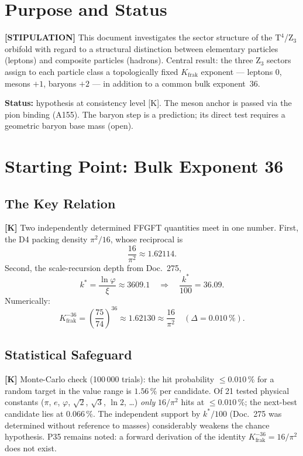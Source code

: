 
\section{Purpose and Status}

\textbf{[STIPULATION]} This document investigates the sector structure
of the T$^4$/Z$_3$ orbifold with regard to a structural distinction
between elementary particles (leptons) and composite particles
(hadrons). Central result: the three Z$_3$ sectors assign to each
particle class a topologically fixed $K_\text{frak}$ exponent ---
leptons $0$, mesons $+1$, baryons $+2$ --- in addition to a common bulk
exponent~$36$.

\textbf{Status:} hypothesis at consistency level [K]. The meson anchor
is passed via the pion binding (A155). The baryon step is a prediction;
its direct test requires a geometric baryon base mass (open).

\section{Starting Point: Bulk Exponent 36}

\subsection{The Key Relation}

\textbf{[K]} Two independently determined FFGFT quantities meet in one
number. First, the D4 packing density $\pi^2/16$, whose reciprocal is
\[
  \frac{16}{\pi^2} \approx 1{.}62114.
\]
Second, the scale-recursion depth from Doc.~275,
\[
  k^* = \frac{\ln\varphi}{\xi} \approx 3609{.}1
  \quad\Rightarrow\quad \frac{k^*}{100} = 36{.}09.
\]
Numerically:
\[
  K_\text{frak}^{-36} = \left(\frac{75}{74}\right)^{36} \approx 1{.}62130
  \approx \frac{16}{\pi^2} \quad (\Delta = 0{.}010\,\%).
\]

\subsection{Statistical Safeguard}

\textbf{[K]} Monte-Carlo check (100\,000 trials): the hit probability
$\leq 0{.}010\,\%$ for a random target in the value range is
$1{.}56\,\%$ per candidate. Of 21 tested physical constants ($\pi$,
$e$, $\varphi$, $\sqrt2$, $\sqrt3$, $\ln 2$, \ldots) \emph{only}
$16/\pi^2$ hits at $\leq 0{.}010\,\%$; the next-best candidate lies at
$0{.}066\,\%$. The independent support by $k^*/100$ (Doc.~275 was
determined without reference to masses) considerably weakens the chance
hypothesis. P35 remains noted: a forward derivation of the identity
$K_\text{frak}^{-36} = 16/\pi^2$ does not exist.

